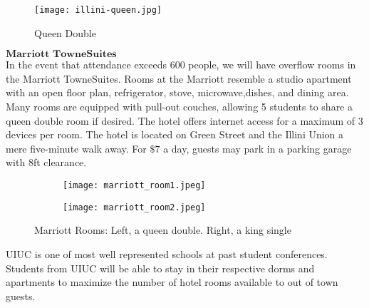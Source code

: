 \begin{figure}[H]
	\centering
	\texttt{[image: illini-queen.jpg]}
	\caption{Queen Double}		
\end{figure} 

$\textbf{Marriott TowneSuites}$\\
In the event that attendance exceeds 600 people, we will have overflow rooms in the Marriott TowneSuites. Rooms at the Marriott resemble a studio apartment with an open floor plan, refrigerator, stove, microwave,dishes, and dining area. Many rooms are equipped with pull-out couches, allowing 5 students to share a queen double room if desired. The hotel offers internet access for a maximum of 3 devices per room. The hotel is located on Green Street and the Illini Union a mere five-minute walk away. For $\$7$ a day, guests may park in a parking garage with 8ft clearance.\\
\begin{figure}[H]
	\centering
	\begin{subfigure}{0.5\textwidth}
		\centering
		\texttt{[image: marriott\_room1.jpeg]}
	\end{subfigure}%
	\begin{subfigure}{0.5\textwidth}
		\centering
		\texttt{[image: marriott\_room2.jpeg]}
	\end{subfigure}
	\caption{Marriott Rooms: Left, a queen double. Right, a king single}		
\end{figure} 

UIUC is one of most well represented schools at past student conferences. Students from UIUC will be able to stay in their respective dorms and apartments to maximize the number of hotel rooms available to out of town guests. 


\begin{table}
\caption{Cost of Hotels}
\label{table:hotels}
	\centering
\end{table}

